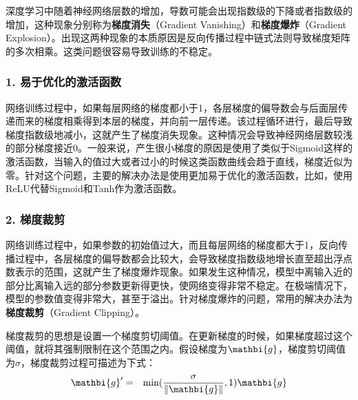 \parinterval  深度学习中随着神经网络层数的增加，导数可能会出现指数级的下降或者指数级的增加，这种现象分别称为{\small\sffamily\bfseries{梯度消失}}（Gradient Vanishing）和{\small\sffamily\bfseries{梯度爆炸}}（Gradient Explosion）。出现这两种现象的本质原因是反向传播过程中链式法则导致梯度矩阵的多次相乘。这类问题很容易导致训练的不稳定。


\subsubsection{1. 易于优化的激活函数}

\parinterval  网络训练过程中，如果每层网络的梯度都小于1，各层梯度的偏导数会与后面层传递而来的梯度相乘得到本层的梯度，并向前一层传递。该过程循环进行，最后导致梯度指数级地减小，这就产生了梯度消失现象。这种情况会导致神经网络层数较浅的部分梯度接近0。一般来说，产生很小梯度的原因是使用了类似于Sigmoid这样的激活函数，当输入的值过大或者过小的时候这类函数曲线会趋于直线，梯度近似为零。针对这个问题，主要的解决办法是使用更加易于优化的激活函数，比如，使用ReLU代替Sigmoid和Tanh作为激活函数。


\subsubsection{2. 梯度裁剪}

\parinterval  网络训练过程中，如果参数的初始值过大，而且每层网络的梯度都大于1，反向传播过程中，各层梯度的偏导数都会比较大，会导致梯度指数级地增长直至超出浮点数表示的范围，这就产生了梯度爆炸现象。如果发生这种情况，模型中离输入近的部分比离输入远的部分参数更新得更快，使网络变得非常不稳定。在极端情况下，模型的参数值变得非常大，甚至于溢出。针对梯度爆炸的问题，常用的解决办法为{\small\sffamily\bfseries{梯度裁剪}}（Gradient Clipping）。

\parinterval    梯度裁剪的思想是设置一个梯度剪切阈值。在更新梯度的时候，如果梯度超过这个阈值，就将其强制限制在这个范围之内。假设梯度为${\mathbi{g}}$，梯度剪切阈值为$\sigma $，梯度裁剪过程可描述为下式：
\begin{eqnarray}
{\mathbi{g}'}&=&{\textrm{min}}(\frac{\sigma}{\Vert {\mathbi{g}}\Vert},1){\mathbi{g}}
\label{eq:9-43}
\end{eqnarray}

